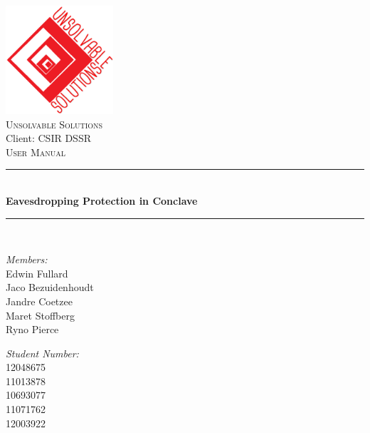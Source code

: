 
\newcommand{\HRule}{\rule{\linewidth}{0.5mm}}
\begin{titlepage}
\begin{center}
\includegraphics[width = 0.3\textwidth]{US_logo.png}~\\[1cm]
\textsc{\LARGE Unsolvable Solutions}\\
Client: CSIR DSSR\\[1.5cm]
\textsc{\Large User Manual}\\[0.5cm]

 \HRule\\[0.4cm]
{ \huge \bfseries  Eavesdropping Protection in Conclave \\[0.4cm] }

 \HRule \\[1.5cm]

\noindent
\begin{minipage}[t]{0.4\textwidth}

	\begin{flushleft} \large
	\emph{Members:}\\
		Edwin Fullard  \\
		Jaco Bezuidenhoudt \\
		Jandre Coetzee\\
		Maret Stoffberg\\
		Ryno Pierce\\
	\end{flushleft}
\end{minipage}%
\begin{minipage}[t]{0.4\textwidth}
\begin{flushright} \large
	\emph{Student Number:} \\
		12048675 \\
		11013878 \\
		 10693077 \\
		 11071762 \\
		 12003922\\
	\end{flushright}
\end{minipage}

\vfill





\end{center}
\end{titlepage}

